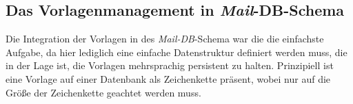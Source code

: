 \subsection{Das Vorlagenmanagement in \emph{Mail}-DB-Schema}
Die Integration der Vorlagen in des \emph{Mail-DB}-Schema war die die einfachste Aufgabe, da hier lediglich eine einfache Datenstruktur definiert werden muss, die in der Lage ist, die Vorlagen mehrsprachig persistent zu halten. Prinzipiell ist eine Vorlage auf einer Datenbank als Zeichenkette präsent, wobei nur auf die Größe der Zeichenkette geachtet werden muss.
